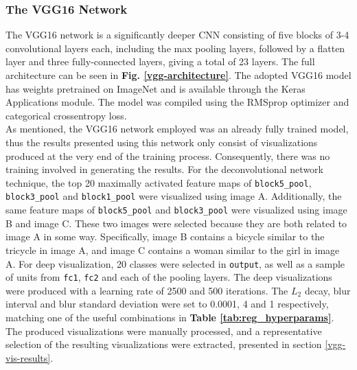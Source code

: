 \subsubsection{The VGG16 Network}

The VGG16 network is a significantly deeper CNN consisting of five blocks of 3-4 convolutional layers each, including the max pooling layers, followed by a flatten layer and three fully-connected layers, giving a total of 23 layers. The full architecture can be seen in \textbf{Fig. \ref{vgg-architecture}}. The adopted VGG16 model has weights pretrained on ImageNet and is available through the Keras Applications module. The model was compiled using the RMSprop optimizer and categorical crossentropy loss. \\

\noindent As mentioned, the VGG16 network employed was an already fully trained model, thus the results presented using this network only consist of visualizations produced at the very end of the training process. Consequently, there was no training involved in generating the results. For the deconvolutional network technique, the top 20 maximally activated feature maps of \texttt{block5\_pool}, \texttt{block3\_pool} and \texttt{block1\_pool} were visualized using image A. Additionally, the same feature maps of \texttt{block5\_pool} and \texttt{block3\_pool} were visualized using image B and image C. These two images were selected because they are both related to image A in some way. Specifically, image B contains a bicycle similar to the tricycle in image A, and image C contains a woman similar to the girl in image A. For deep visualization, 20 classes were selected in \texttt{output}, as well as a sample of units from \texttt{fc1}, \texttt{fc2} and each of the pooling layers. The deep visualizations were produced with a learning rate of 2500 and 500 iterations. The $L_2$ decay, blur interval and blur standard deviation were set to 0.0001, 4 and 1 respectively, matching one of the useful combinations in \textbf{Table \ref{tab:reg_hyperparams}}. The produced visualizations were manually processed, and a representative selection of the resulting visualizations were extracted, presented in section \ref{vgg-vis-results}.

